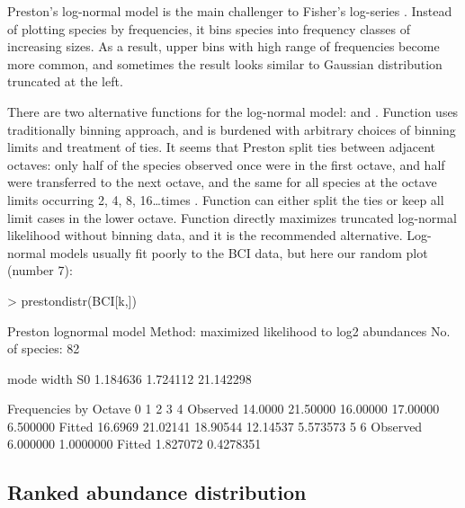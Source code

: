 \documentclass[a4paper,10pt,twocolumn]{article}
\begin{document}
Preston's log-normal model is the main challenger to Fisher's
log-series \citep{Preston48}.  Instead of plotting species by
frequencies, it bins species into frequency classes of increasing
sizes.  As a result, upper bins with high range of frequencies become
more common, and sometimes the result looks similar to Gaussian
distribution truncated at the left.

There are two alternative functions for the log-normal model:
 and .  Function 
uses traditionally binning approach, and is burdened with arbitrary
choices of binning limits and treatment of ties. It seems that Preston
split ties between adjacent octaves: only half of the species observed
once were in the first octave, and half were transferred to the next
octave, and the same for all species at the octave limits occurring 2,
4, 8, 16\ldots times \citep{WilliamsonGaston05}. Function
 can either split the ties or keep all limit cases in
the lower octave.  Function  directly maximizes
truncated log-normal likelihood without binning data, and it is the
recommended alternative.  Log-normal models usually fit poorly to the
BCI data, but here our random plot (number 7):
\begin{Schunk}
\begin{Sinput}
> prestondistr(BCI[k,])
\end{Sinput}
\begin{Soutput}
Preston lognormal model
Method: maximized likelihood to log2 abundances 
No. of species: 82 

     mode     width        S0 
 1.184636  1.724112 21.142298 

Frequencies by Octave
               0        1        2        3        4
Observed 14.0000 21.50000 16.00000 17.00000 6.500000
Fitted   16.6969 21.02141 18.90544 12.14537 5.573573
                5         6
Observed 6.000000 1.0000000
Fitted   1.827072 0.4278351
\end{Soutput}
\end{Schunk}

\subsection{Ranked abundance distribution}
\end{document}
